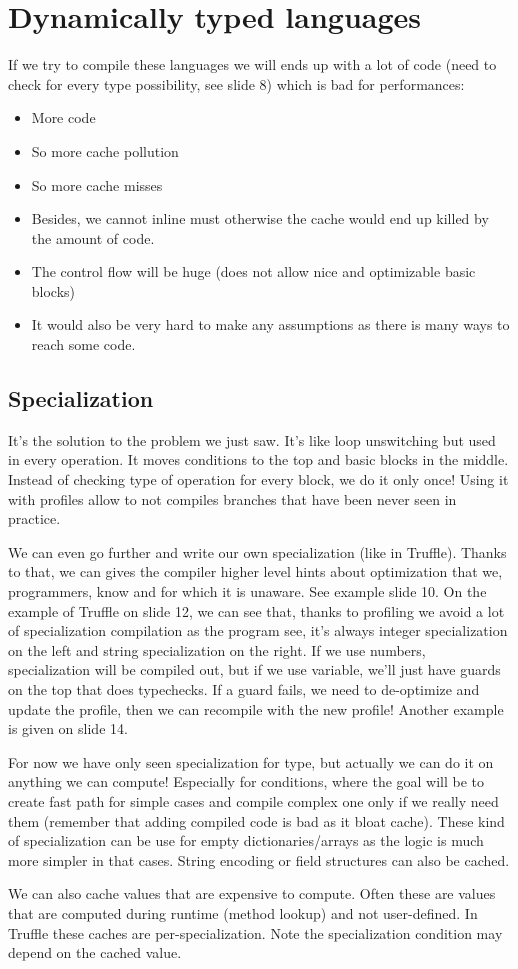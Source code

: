 \section{Dynamically typed languages}
If we try to compile these languages we will ends up with a lot of code (need to
check for every type possibility, see slide 8) which is bad for performances:
\begin{itemize}
    \item More code
    \item So more cache pollution
    \item So more cache misses
    \item Besides, we cannot inline must otherwise the cache would end up killed
    by the amount of code. 
    \item The control flow will be huge (does not allow nice and optimizable
    basic blocks)
    \item It would also be very hard to make any assumptions as there is many
    ways to reach some code.
\end{itemize}
\subsection{Specialization}
It's the solution to the problem we just saw. It's like loop unswitching but
used in every operation. It moves conditions to the top and basic blocks in the
middle. Instead of checking type of operation for every block, we do it only
once! Using it with profiles allow to not compiles branches that have been never
seen in practice. 

We can even go further and write our own specialization (like in Truffle).
Thanks to that, we can gives the compiler higher level hints about optimization
that we, programmers, know and for which it is unaware. See example slide 10. On
the example of Truffle on slide 12, we can see that, thanks to profiling we
avoid a lot of specialization compilation as the program see, it's always
integer specialization on the left and string specialization on the right. If we
use numbers, specialization will be compiled out, but if we use variable, we'll
just have guards on the top that does typechecks. If a guard fails, we need to
de-optimize and update the profile, then we can recompile with the new profile!
Another example is given on slide 14.

For now we have only seen specialization for type, but actually we can do it on
anything we can compute! Especially for conditions, where the goal will be to
create fast path for simple cases and compile complex one only if we really need
them (remember that adding compiled code is bad as it bloat cache). These kind
of specialization can be use for empty dictionaries/arrays as the logic is much
more simpler in that cases. String encoding or field structures can also be
cached.

We can also cache values that are expensive to compute. Often these are values
that are computed during runtime (method lookup) and not user-defined. In
Truffle these caches are per-specialization. Note the specialization condition
may depend on the cached value.